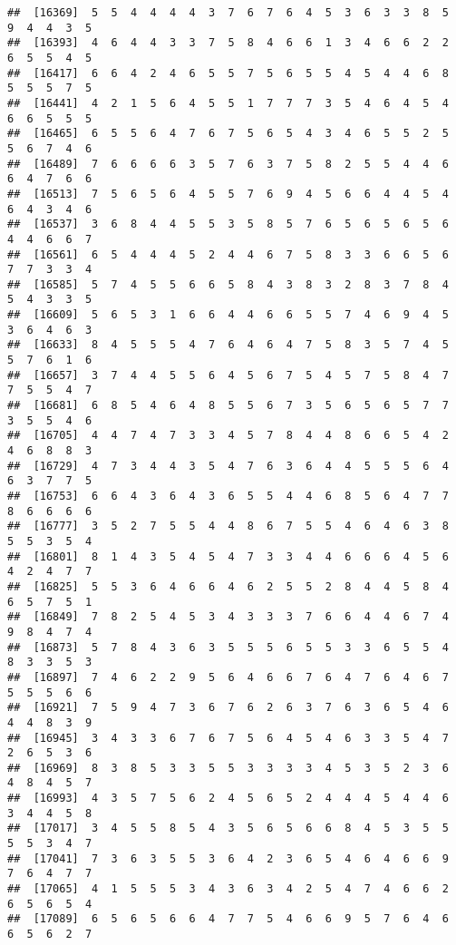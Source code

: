 \documentclass[
]{book}
\begin{document}
\begin{verbatim}
##  [16369]  5  5  4  4  4  4  3  7  6  7  6  4  5  3  6  3  3  8  5  9  4  4  3  5
##  [16393]  4  6  4  4  3  3  7  5  8  4  6  6  1  3  4  6  6  2  2  6  5  5  4  5
##  [16417]  6  6  4  2  4  6  5  5  7  5  6  5  5  4  5  4  4  6  8  5  5  5  7  5
##  [16441]  4  2  1  5  6  4  5  5  1  7  7  7  3  5  4  6  4  5  4  6  6  5  5  5
##  [16465]  6  5  5  6  4  7  6  7  5  6  5  4  3  4  6  5  5  2  5  5  6  7  4  6
##  [16489]  7  6  6  6  6  3  5  7  6  3  7  5  8  2  5  5  4  4  6  6  4  7  6  6
##  [16513]  7  5  6  5  6  4  5  5  7  6  9  4  5  6  6  4  4  5  4  6  4  3  4  6
##  [16537]  3  6  8  4  4  5  5  3  5  8  5  7  6  5  6  5  6  5  6  4  4  6  6  7
##  [16561]  6  5  4  4  4  5  2  4  4  6  7  5  8  3  3  6  6  5  6  7  7  3  3  4
##  [16585]  5  7  4  5  5  6  6  5  8  4  3  8  3  2  8  3  7  8  4  5  4  3  3  5
##  [16609]  5  6  5  3  1  6  6  4  4  6  6  5  5  7  4  6  9  4  5  3  6  4  6  3
##  [16633]  8  4  5  5  5  4  7  6  4  6  4  7  5  8  3  5  7  4  5  5  7  6  1  6
##  [16657]  3  7  4  4  5  5  6  4  5  6  7  5  4  5  7  5  8  4  7  7  5  5  4  7
##  [16681]  6  8  5  4  6  4  8  5  5  6  7  3  5  6  5  6  5  7  7  3  5  5  4  6
##  [16705]  4  4  7  4  7  3  3  4  5  7  8  4  4  8  6  6  5  4  2  4  6  8  8  3
##  [16729]  4  7  3  4  4  3  5  4  7  6  3  6  4  4  5  5  5  6  4  6  3  7  7  5
##  [16753]  6  6  4  3  6  4  3  6  5  5  4  4  6  8  5  6  4  7  7  8  6  6  6  6
##  [16777]  3  5  2  7  5  5  4  4  8  6  7  5  5  4  6  4  6  3  8  5  5  3  5  4
##  [16801]  8  1  4  3  5  4  5  4  7  3  3  4  4  6  6  6  4  5  6  4  2  4  7  7
##  [16825]  5  5  3  6  4  6  6  4  6  2  5  5  2  8  4  4  5  8  4  6  5  7  5  1
##  [16849]  7  8  2  5  4  5  3  4  3  3  3  7  6  6  4  4  6  7  4  9  8  4  7  4
##  [16873]  5  7  8  4  3  6  3  5  5  5  6  5  5  3  3  6  5  5  4  8  3  3  5  3
##  [16897]  7  4  6  2  2  9  5  6  4  6  6  7  6  4  7  6  4  6  7  5  5  5  6  6
##  [16921]  7  5  9  4  7  3  6  7  6  2  6  3  7  6  3  6  5  4  6  4  4  8  3  9
##  [16945]  3  4  3  3  6  7  6  7  5  6  4  5  4  6  3  3  5  4  7  2  6  5  3  6
##  [16969]  8  3  8  5  3  3  5  5  3  3  3  3  4  5  3  5  2  3  6  4  8  4  5  7
##  [16993]  4  3  5  7  5  6  2  4  5  6  5  2  4  4  4  5  4  4  6  3  4  4  5  8
##  [17017]  3  4  5  5  8  5  4  3  5  6  5  6  6  8  4  5  3  5  5  5  5  3  4  7
##  [17041]  7  3  6  3  5  5  3  6  4  2  3  6  5  4  6  4  6  6  9  7  6  4  7  7
##  [17065]  4  1  5  5  5  3  4  3  6  3  4  2  5  4  7  4  6  6  2  6  5  6  5  4
##  [17089]  6  5  6  5  6  6  4  7  7  5  4  6  6  9  5  7  6  4  6  6  5  6  2  7

\end{verbatim}
\end{document}
